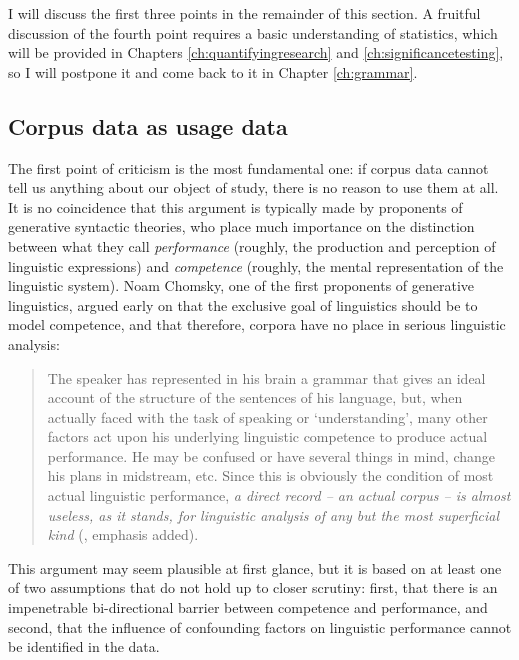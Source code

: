 I will discuss the first three points in the remainder of this section. A fruitful discussion of the fourth point requires a basic understanding of statistics, which will be provided in Chapters \ref{ch:quantifyingresearch} and \ref{ch:significancetesting}, so I will postpone it and come back to it in Chapter \ref{ch:grammar}.

\subsection{Corpus data as usage data}
\label{sec:corpusdataasusagedata}

The first point of criticism is the most fundamental one: if corpus data cannot tell us anything about our object of study, there is no reason to use them at all. It is no coincidence that this argument is typically made by proponents of generative syntactic theories, who place much importance on the distinction between what they call \emph{performance} (roughly, the production and perception of linguistic expressions) and \emph{competence} (roughly, the mental representation of the linguistic system). Noam Chomsky, one of the first proponents of generative linguistics, argued early on that the exclusive goal of linguistics should be to model competence, and that therefore, corpora have no place in serious linguistic analysis:

\begin{quote}The speaker has represented in his brain a grammar that gives an ideal account of the structure of the sentences of his language, but, when actually faced with the task of speaking or `understanding', many other factors act upon his underlying linguistic competence to produce actual performance. He may be confused or have several things in mind, change his plans in midstream, etc. Since this is obviously the condition of most actual linguistic performance, \emph{a direct record -- an actual corpus -- is almost useless, as it stands, for linguistic analysis of any but the most superficial kind} (\citealt[36]{chomsky_development_1964}, emphasis added).
\end{quote}

This argument may seem plausible at first glance, but it is based on at least one of two assumptions that do not hold up to closer scrutiny: first, that there is an impenetrable bi-directional barrier between competence and performance, and second, that the influence of confounding factors on linguistic performance cannot be identified in the data.

